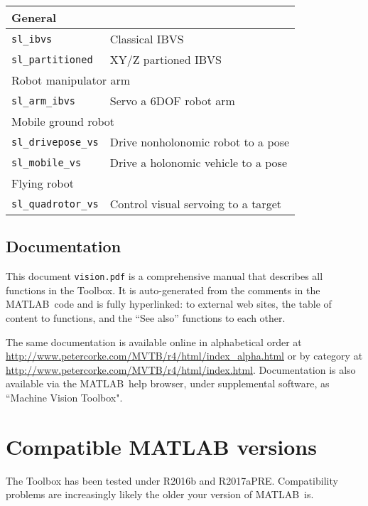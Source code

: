 \documentclass[a4paper,twoside]{report}
\def\Mlab{MATLAB}
\begin{document}
\begin{center}
\begin{tabular}{|l|l|}\hline
\multicolumn{2}{|l|}{General} \\\hline
\texttt{sl\_ibvs} & Classical IBVS \\
\texttt{sl\_partitioned} &  XY/Z partioned IBVS \\\hline\hline
\multicolumn{2}{|l|}{Robot manipulator arm} \\\hline
\texttt{sl\_arm\_ibvs} &  Servo a 6DOF robot arm\\\hline\hline
\multicolumn{2}{|l|}{Mobile ground robot} \\\hline
\texttt{sl\_drivepose\_vs} &  Drive nonholonomic robot to a pose\\
\texttt{sl\_mobile\_vs} &  Drive a holonomic vehicle to a pose\\\hline\hline
\multicolumn{2}{|l|}{Flying robot} \\\hline
\texttt{sl\_quadrotor\_vs} &  Control visual servoing to a target\\ \hline
\end{tabular}
\end{center}




\subsection{Documentation}
This document {\tt vision.pdf} is a comprehensive manual that describes all functions in the Toolbox.
It is auto-generated from the comments in the \Mlab\ code and is fully hyperlinked:
to external web sites, the table of content to functions, and the ``See also'' functions
to each other.

The same documentation is available online in
alphabetical order at \url{http://www.petercorke.com/MVTB/r4/html/index_alpha.html}
or by category at \url{http://www.petercorke.com/MVTB/r4/html/index.html}.
Documentation is also available via the \Mlab\ help browser,  under supplemental software, as ``Machine Vision
Toolbox".


\section{Compatible MATLAB versions}
The Toolbox has been tested under R2016b and R2017aPRE.  Compatibility problems are increasingly likely the older your version of \Mlab\ is.
\end{document}
